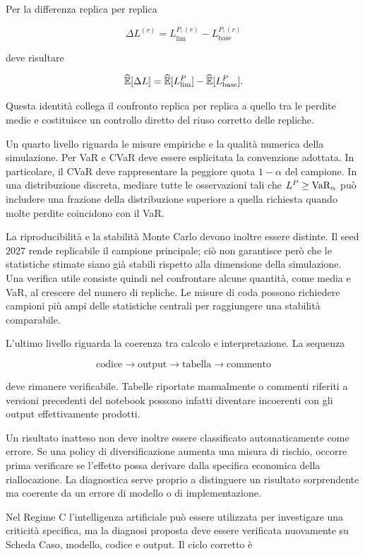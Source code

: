 Per la differenza replica per replica

\[
\Delta L^{(r)}
=
L_{\mathrm{lim}}^{P,(r)}
-
L_{\mathrm{base}}^{P,(r)}
\]

\noindent deve risultare

\[
\widehat{\mathbb{E}}[\Delta L]
=
\widehat{\mathbb{E}}[L_{\mathrm{lim}}^P]
-
\widehat{\mathbb{E}}[L_{\mathrm{base}}^P].
\]

Questa identit\`a collega il confronto replica per replica a quello tra le
perdite medie e costituisce un controllo diretto del riuso corretto delle repliche.

Un quarto livello riguarda le misure empiriche e la qualit\`a numerica della
simulazione. Per VaR e CVaR deve essere esplicitata la convenzione adottata.
In particolare, il CVaR deve rappresentare la peggiore quota
$1-\alpha$ del campione. In una distribuzione discreta, mediare tutte le
osservazioni tali che $L^P\geq \operatorname{VaR}_\alpha$ pu\`o includere una frazione
della distribuzione superiore a quella richiesta quando molte perdite
coincidono con il VaR.

La riproducibilit\`a e la stabilit\`a Monte Carlo devono inoltre essere
distinte. Il seed $2027$ rende replicabile il campione principale; ci\`o
non garantisce per\`o che le statistiche stimate siano gi\`a stabili rispetto
alla dimensione della simulazione. Una verifica utile consiste quindi nel
confrontare alcune quantit\`a, come media e VaR, al crescere del numero di
repliche. Le misure di coda possono richiedere campioni pi\`u ampi delle
statistiche centrali per raggiungere una stabilit\`a comparabile.

L'ultimo livello riguarda la coerenza tra calcolo e interpretazione. La
sequenza

\[
\text{codice}
\longrightarrow
\text{output}
\longrightarrow
\text{tabella}
\longrightarrow
\text{commento}
\]

\noindent deve rimanere verificabile. Tabelle riportate manualmente o commenti riferiti
a versioni precedenti del notebook possono infatti diventare incoerenti con
gli output effettivamente prodotti.

Un risultato inatteso non deve inoltre essere classificato automaticamente
come errore. Se una policy di diversificazione aumenta una misura di rischio,
occorre prima verificare se l'effetto possa derivare dalla specifica
economica della riallocazione. La diagnostica serve proprio a distinguere un
risultato sorprendente ma coerente da un errore di modello o di
implementazione.

Nel Regime C l'intelligenza artificiale pu\`o essere utilizzata per
investigare una criticit\`a specifica, ma la diagnosi proposta deve essere
verificata nuovamente su Scheda Caso, modello, codice e output. Il ciclo
corretto \`e

